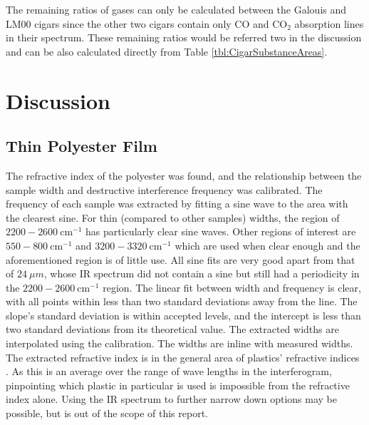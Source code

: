 \documentclass[reprint,amsmath,amssymb,aps, prl,superscriptaddress]{revtex4-2}
\begin{document}
The remaining ratios of gases can only be calculated between the Galouis and LM00 cigars since the other two cigars contain only CO and $\text{CO}_{2}$ absorption lines in their spectrum. These remaining ratios would be referred two in the discussion and can be also calculated directly from Table \ref{tbl:CigarSubstanceAreas}.

\section{Discussion}
\subsection{Thin Polyester Film}
The refractive index of the polyester was found, and the relationship between the sample width and destructive interference frequency was calibrated.
The frequency of each sample was extracted by fitting a sine wave to the area with the clearest sine. For thin (compared to other samples) widths, the region of $2200-2600\ \text{cm}^{-1}$ has particularly clear sine waves.
Other regions of interest are $550-800\ \text{cm}^{-1}$ and $3200-3320\ \text{cm}^{-1}$ which are used when clear enough and the aforementioned region is of little use.
All sine fits are very good apart from that of $24\ \mu m$, whose IR spectrum did not contain a sine but still had a periodicity in the $2200-2600\ \text{cm}^{-1}$ region.
The linear fit between width and frequency is clear, with all points within less than two standard deviations away from the line.
The slope's standard deviation is within accepted levels, and the intercept is less than two standard deviations from its theoretical value.
The extracted widths are interpolated using the calibration. The widths are inline with measured widths.
The extracted refractive index is in the general area of plastics' refractive indices \cite{plasticRefract}. As this is an average over the range of wave lengths in the interferogram, pinpointing which plastic in particular is used is impossible from the refractive index alone. Using the IR spectrum to further narrow down options may be possible, but is out of the scope of this report.
\end{document}
